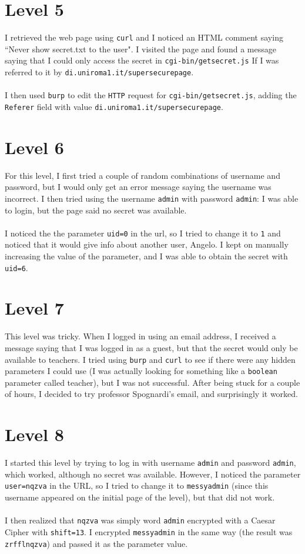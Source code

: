 \documentclass[12pt,a4paper]{article}
\begin{document}
	\section*{Level 5}

	I retrieved the web page using \texttt{curl} and I noticed an HTML comment saying ``Never show secret.txt to the user". I visited the page and found a message saying that I could only access the secret in \texttt{cgi-bin/getsecret.js} If I was referred to it by \texttt{di.uniroma1.it/supersecurepage}.\\\\
	I then used \texttt{burp} to edit the \texttt{HTTP} request for \texttt{cgi-bin/getsecret.js}, adding the \texttt{Referer} field with value \texttt{di.uniroma1.it/supersecurepage}.

	\section*{Level 6}
	For this level, I first tried a couple of random combinations of username and password, but I would only get an error message saying the username was incorrect. I then tried using the username \texttt{admin} with password \texttt{admin}: I was able to login, but the page said no secret was available.\\\\
	I noticed the the parameter \texttt{uid=0} in the url, so I tried to change it to \texttt{1} and noticed that it would give info about another user, Angelo. I kept on manually increasing the value of the parameter, and I was able to obtain the secret with \texttt{uid=6}.


	\section*{Level 7}
	This level was tricky. When I logged in using an email address, I received a message saying that I was logged in as a guest, but that the secret would only be available to teachers. I tried using \texttt{burp} and \texttt{curl} to see if there were any hidden parameters I could use (I was actually looking for something like a \texttt{boolean} parameter called teacher), but I was not successful. After being stuck for a couple of hours, I decided to try professor Spognardi's email, and surprisingly it worked.

	\section*{Level 8}
	I started this level by trying to log in with username \texttt{admin} and password \texttt{admin}, which worked, although no secret was available.
	However, I noticed the parameter \texttt{user=nqzva} in the URL, so I tried to change it to \texttt{messyadmin} (since this username appeared on the initial page of the level), but that did not work.\\\\I then realized that \texttt{nqzva} was simply word \texttt{admin} encrypted with a Caesar Cipher with \texttt{shift=13}. I encrypted \texttt{messyadmin} in the same way (the result was \texttt{zrfflnqzva}) and passed it as the parameter value.
\end{document}
